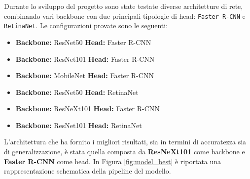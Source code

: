 \documentclass[minted, draw]{../tex/hebdomon}
\begin{document}

Durante lo sviluppo del progetto sono state testate diverse architetture di rete, combinando vari backbone con due principali tipologie di head: \texttt{Faster R-CNN} e \texttt{RetinaNet}. Le configurazioni provate sono le seguenti:

%

%

\begin{itemize}
    \item \textbf{Backbone:} ResNet50 \quad \textbf{Head:} Faster R-CNN
    \item \textbf{Backbone:} ResNet101 \quad \textbf{Head:} Faster R-CNN
    \item \textbf{Backbone:} MobileNet \quad \textbf{Head:} Faster R-CNN
    \item \textbf{Backbone:} ResNet50 \quad \textbf{Head:} RetinaNet
    \item \textbf{Backbone:} ResNeXt101 \quad \textbf{Head:} Faster R-CNN
    \item \textbf{Backbone:} ResNet101 \quad \textbf{Head:} RetinaNet
\end{itemize}

L’architettura che ha fornito i migliori risultati, sia in termini di accuratezza sia di generalizzazione, è stata quella composta da \textbf{ResNeXt101} come backbone e \textbf{Faster R-CNN} come head. In Figura \ref{fig:model_best} è riportata una rappresentazione schematica della pipeline del modello.
\end{document}
